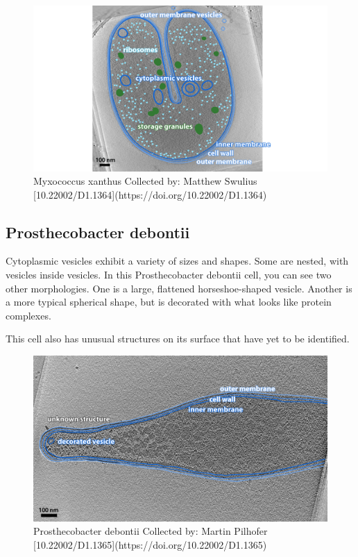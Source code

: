 \documentclass[]{tufte-book}
\begin{document}
\begin{figure}
\includegraphics{img/2_4b_Mxanthus} \caption[Myxococcus xanthus Collected by]{Myxococcus xanthus Collected by: Matthew Swulius [10.22002/D1.1364](https://doi.org/10.22002/D1.1364)}\label{fig:unnamed-chunk-13}
\end{figure}

\hypertarget{Cytoplasmic_vesicle_variety}{\subsection{Prosthecobacter
debontii}\label{Cytoplasmic_vesicle_variety}}

Cytoplasmic vesicles exhibit a variety of sizes and shapes. Some are
nested, with vesicles inside vesicles. In this Prosthecobacter debontii
cell, you can see two other morphologies. One is a large, flattened
horseshoe-shaped vesicle. Another is a more typical spherical shape, but
is decorated with what looks like protein complexes.

This cell also has unusual structures on its surface that have yet to be
identified.

\begin{figure}
\includegraphics{img/2_4c_Pdebontii} \caption[Prosthecobacter debontii Collected by]{Prosthecobacter debontii Collected by: Martin Pilhofer [10.22002/D1.1365](https://doi.org/10.22002/D1.1365)}\label{fig:unnamed-chunk-14}
\end{figure}
\end{document}
